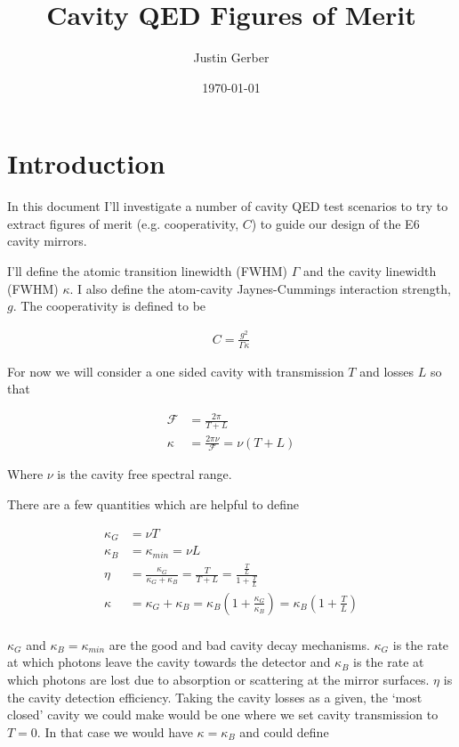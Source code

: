 \documentclass[12pt]{article}
\begin{document}
\title{Cavity QED Figures of Merit}
\author{Justin Gerber}
\date{\today}
\maketitle

\section{Introduction}

In this document I'll investigate a number of cavity QED test scenarios to try to extract figures of merit (e.g. cooperativity, $C$) to guide our design of the E6 cavity mirrors.

I'll define the atomic transition linewidth (FWHM) $\Gamma$ and the cavity linewidth (FWHM) $\kappa$. I also define the atom-cavity Jaynes-Cummings interaction strength, $g$. The cooperativity is defined to be

\begin{align}
C = \frac{g^2}{\Gamma \kappa}
\end{align}

For now we will consider a one sided cavity with transmission $T$ and losses $L$ so that

\begin{align}
\mathcal{F} &= \frac{2\pi}{T+L}\\
\kappa &= \frac{2\pi \nu}{\mathcal{F}} = \nu(T+L)
\end{align}

Where $\nu$ is the cavity free spectral range.

There are a few quantities which are helpful to define

\begin{align}
\kappa_G &= \nu T\\
\kappa_B &= \kappa_{min} = \nu L\\
\eta &= \frac{\kappa_G}{\kappa_G+\kappa_B} = \frac{T}{T+L} = \frac{\frac{T}{L}}{1+\frac{T}{L}}\\
\kappa &= \kappa_G + \kappa_B = \kappa_B\left(1+\frac{\kappa_G}{\kappa_B}\right) = \kappa_B \left(1+\frac{T}{L}\right)\\
\end{align}

$\kappa_G$ and $\kappa_B = \kappa_{min}$ are the good and bad cavity decay mechanisms. $\kappa_G$ is the rate at which photons leave the cavity towards the detector and $\kappa_B$ is the rate at which photons are lost due to absorption or scattering at the mirror surfaces. $\eta$ is the cavity detection efficiency. Taking the cavity losses as a given, the `most closed' cavity we could make would be one where we set cavity transmission to $T=0$. In that case we would have $\kappa = \kappa_B$ and could define
\end{document}
